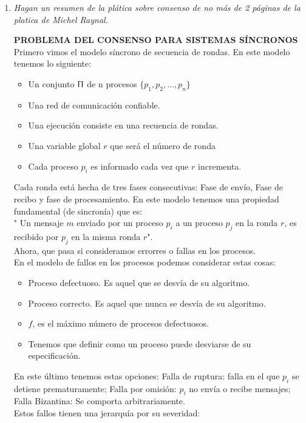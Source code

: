 \documentclass{article}
\begin{document}
\begin{enumerate}
  \item{
      \textsl{
        Hagan un resumen de la plática sobre consenso de no más de 2
        páginas de la platica de Michel Raynal.
      }

      \textbf{PROBLEMA DEL CONSENSO PARA SISTEMAS SÍNCRONOS}\\
      Primero vimos el modelo síncrono de secuencia de rondas.
      En este modelo tenemos lo siguiente:
      \begin{itemize}
        \item Un conjunto $\Uppi$ de n procesos $\{p_{1}, p_{2}, ..., p_{n}\}$
        \item Una red de comunicación confiable.
        \item Una ejecución consiste en una recuencia de rondas.
        \item Una variable global $r$ que será el número de ronda
        \item Cada proceso $p_{i}$ es informado cada vez que $r$ incrementa.
      \end{itemize}
      Cada ronda está hecha de tres fases consecutivas: Fase de envío, Fase de recibo y fase de procesamiento.
      En este modelo tenemos una propiedad fundamental (de sincronía) que es:\\
      " Un mensaje $m$ enviado por un proceso $p_{i}$ a un proceso $p_{j}$ en la ronda
      $r$, es recibido por $p_{j}$ en la misma ronda $r$".\\
      Ahora, que pasa si consideramos errorres o fallas en los procesos.\\
      En el modelo de fallos en los procesos podemos considerar estas cosas:
      \begin{itemize}
        \item Proceso defectuoso. Es aquel que se desvía de su algoritmo.
        \item Proceso correcto. Es aquel que nunca se desvía de su algoritmo.
        \item $f$, es el máximo número de procesos defectuosos.
        \item Tenemos que definir como un proceso puede desviarse de su especificación.
      \end{itemize}
       En este último tenemos estas opciones: Falla de ruptura: falla en el que $p_{i}$
       se detiene prematuramente; Falla por omisión: $p_{i}$ no envía o recibe 
       mensajes; Falla Bizantina: Se comporta arbitrariamente.\\
       Estos fallos tienen una jerarquía por su severidad:\\
}
\end{enumerate}
\end{document}
